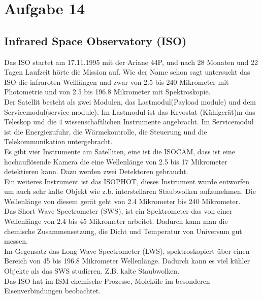 \section{Aufgabe 14}
\subsection{Infrared Space Observatory (ISO)}
Das ISO startet am 17.11.1995 mit der Ariane 44P, und nach 28 Monaten und 22 Tagen Laufzeit hörte die Mission auf. Wie der Name schon sagt untersucht das ISO die infraroten Welllängen und zwar von 2.5 bis 240 Mikrometer mit Photometrie und von 2.5 bis 196.8 Mikrometer mit Spektroskopie.\\
Der Satellit besteht als zwei Modulen, das Lastmodul(Payload module) und dem Servicemodul(service module). Im Lastmodul ist das Kryostat (Kühlgerät)m das Teleskop und die 4 wissenschaftlichen Instrumente angebracht. Im Servicemodul ist die Energiezufuhr, die Wärmekontrolle, die Steuerung und die Telekommunikation untergebracht.\\
Es gibt vier Instrumente am Satelliten, eine ist die ISOCAM, dass ist eine hochauflösende Kamera die eine Wellenlänge von 2.5 bis 17 Mikrometer detektieren kann. Dazu werden zwei Detektoren gebraucht.\\
Ein weiteres Instrument ist das ISOPHOT, dieses Instrument wurde entworfen um auch sehr kalte Objekt wie z.b. interstellaren Staubwolken aufzunehmen. Die Wellenlänge von diesem gerät geht von 2.4 Mikrometer bis 240 Mikrometer.\\
Das Short Wave Spectrometer (SWS), ist ein Spektrometer das von einer Wellenlänge von 2.4 bis 45 Mikrometer arbeitet. Dadurch kann man die chemische Zusammensetzung, die Dicht und Temperatur von Universum gut messen.\\
Im Gegensatz das Long Wave Spectrometer (LWS), spektroskopiert über einen Bereich von 45 bis 196.8 Mikrometer Wellenlänge. Dadurch kann es viel kühler Objekte als das SWS studieren. Z.B. kalte Staubwolken.\\
Das ISO hat im ISM chemische Prozesse, Moleküle im besonderen Eisenverbindungen beobachtet.
